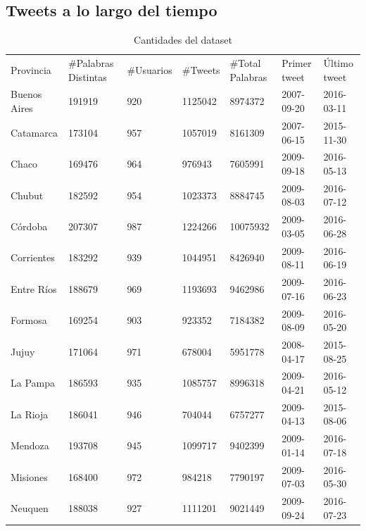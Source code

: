 \subsection{Tweets a lo largo del tiempo}

\begin{table}[]
\centering
\caption{Cantidades del dataset}
\label{tab:cantidades}
\begin{tabular}{lllllll}
Provincia      & \#Palabras Distintas & \#Usuarios & \#Tweets & \#Total Palabras & Primer tweet & Último tweet \\
Buenos Aires    & 191919       & 920          & 1125042    & 8974372   & 2007-09-20   & 2016-03-11   \\
Catamarca      & 173104       & 957          & 1057019    & 8161309   & 2007-06-15   & 2015-11-30   \\
Chaco          & 169476       & 964          & 976943     & 7605991   & 2009-09-18   & 2016-05-13   \\
Chubut         & 182592       & 954          & 1023373    & 8884745   & 2009-08-03   & 2016-07-12   \\
Córdoba        & 207307       & 987          & 1224266    & 10075932  & 2009-03-05   & 2016-06-28   \\
Corrientes     & 183292       & 939          & 1044951    & 8426940   & 2009-08-11   & 2016-06-19   \\
Entre Ríos      & 188679       & 969          & 1193693    & 9462986   & 2009-07-16   & 2016-06-23   \\
Formosa        & 169254       & 903          & 923352     & 7184382   & 2009-08-09   & 2016-05-20   \\
Jujuy          & 171064       & 971          & 678004     & 5951778   & 2008-04-17   & 2015-08-25   \\
La Pampa        & 186593       & 935          & 1085757    & 8996318   & 2009-04-21   & 2016-05-12   \\
La Rioja        & 186041       & 946          & 704044     & 6757277   & 2009-04-13   & 2015-08-06   \\
Mendoza        & 193708       & 945          & 1099717    & 9402399   & 2009-01-14   & 2016-07-18   \\
Misiones       & 168400       & 972          & 984218     & 7790197   & 2009-07-03   & 2016-05-30   \\
Neuquen        & 188038       & 927          & 1111201    & 9021449   & 2009-09-24   & 2016-07-23   \\

\end{tabular}
\end{table}
